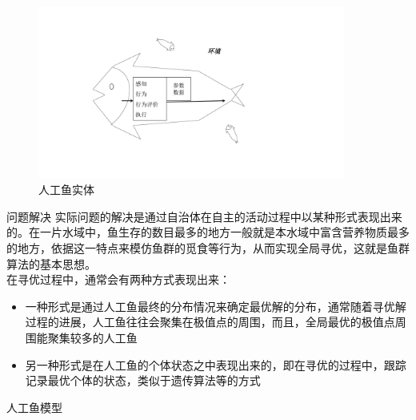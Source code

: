 \documentclass[UTF8]{ctexart}
\begin{document}
\begin{section}
\begin{subsection}
\begin{subsubsection}
		\begin{figure}[htbp]
			\centering
			\includegraphics[width=0.9\textwidth]{../../pic/fish2.pdf}
			\caption{人工鱼实体}
		\end{figure}
		\end{subsubsection}
		\begin{subsubsection}
			{问题解决}	实际问题的解决是通过自治体在自主的活动过程中以某种形式表现出来的。在一片水域中，鱼生存的数目最多的地方一般就是本水域中富含营养物质最多的地方，依据这一特点来模仿鱼群的觅食等行为，从而实现全局寻优，这就是鱼群算法的基本思想。\\在寻优过程中，通常会有两种方式表现出来：
		\begin{itemize}
			\item{一种形式是通过人工鱼最终的分布情况来确定最优解的分布，通常随着寻优解过程的进展，人工鱼往往会聚集在极值点的周围，而且，全局最优的极值点周围能聚集较多的人工鱼}
			\item{另一种形式是在人工鱼的个体状态之中表现出来的，即在寻优的过程中，跟踪记录最优个体的状态，类似于遗传算法等的方式}
		\end{itemize}
		\end{subsubsection}
	\end{subsection}
	\begin{subsection}
		{人工鱼模型}

\end{subsection}
\end{section}
\end{document}
